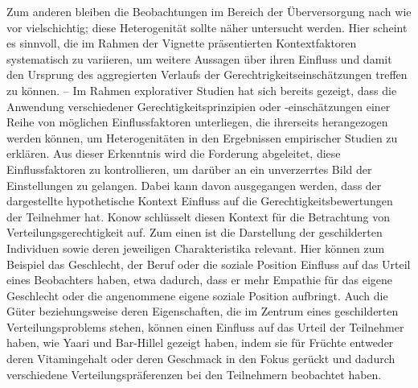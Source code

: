 \documentclass[a4paper]{thesis}
\begin{document}
Zum anderen bleiben die Beobachtungen im Bereich der Überversorgung nach wie vor vielschichtig; diese Heterogenität sollte näher untersucht werden. Hier scheint es sinnvoll, die im Rahmen der Vignette präsentierten Kontextfaktoren systematisch zu variieren, um weitere Aussagen über ihren Einfluss und damit den Ursprung des aggregierten Verlaufs der Gerechtrigkeitseinschätzungen treffen zu können. -- Im Rahmen explorativer Studien hat sich bereits gezeigt, dass die Anwendung verschiedener Gerechtigkeitsprinzipien oder -einschätzungen einer Reihe von möglichen Einflussfaktoren unterliegen, die ihrerseits herangezogen werden können, um Heterogenitäten in den Ergebnissen empirischer Studien zu erklären. Aus dieser Erkenntnis wird die Forderung abgeleitet, diese Einflussfaktoren zu kontrollieren, um darüber an ein unverzerrtes Bild der Einstellungen zu gelangen. Dabei kann davon ausgegangen werden, dass der dargestellte hypothetische Kontext Einfluss auf die Gerechtigkeitsbewertungen der Teilnehmer hat. Konow schlüsselt diesen Kontext für die Betrachtung von Verteilungsgerechtigkeit auf. Zum einen ist die Darstellung der geschilderten Individuen sowie deren jeweiligen Charakteristika relevant. Hier können zum Beispiel das Geschlecht, der Beruf oder die soziale Position Einfluss auf das Urteil eines Beobachters haben, etwa dadurch, dass er mehr Empathie für das eigene Geschlecht oder die angenommene eigene soziale Position aufbringt. Auch die Güter beziehungsweise deren Eigenschaften, die im Zentrum eines geschilderten Verteilungsproblems stehen, können einen Einfluss auf das Urteil der Teilnehmer haben, wie Yaari und Bar-Hillel gezeigt haben, indem sie für Früchte entweder deren Vitamingehalt oder deren Geschmack in den Fokus gerückt und dadurch verschiedene Verteilungspräferenzen bei den Teilnehmern beobachtet haben.
\end{document}
